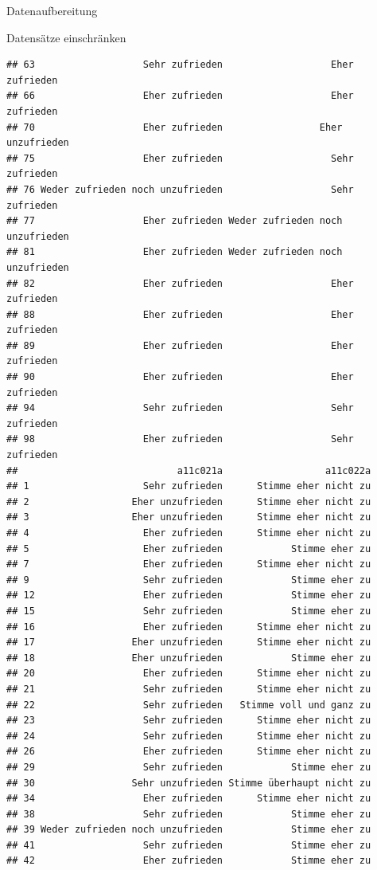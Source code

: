 \documentclass[ignorenonframetext,]{beamer}
\begin{document}
\begin{frame}[fragile]{Datenaufbereitung}
\begin{block}{Datensätze einschränken}
\begin{verbatim}
## 63                   Sehr zufrieden                   Eher zufrieden
## 66                   Eher zufrieden                   Eher zufrieden
## 70                   Eher zufrieden                 Eher unzufrieden
## 75                   Eher zufrieden                   Sehr zufrieden
## 76 Weder zufrieden noch unzufrieden                   Sehr zufrieden
## 77                   Eher zufrieden Weder zufrieden noch unzufrieden
## 81                   Eher zufrieden Weder zufrieden noch unzufrieden
## 82                   Eher zufrieden                   Eher zufrieden
## 88                   Eher zufrieden                   Eher zufrieden
## 89                   Eher zufrieden                   Eher zufrieden
## 90                   Eher zufrieden                   Eher zufrieden
## 94                   Sehr zufrieden                   Sehr zufrieden
## 98                   Eher zufrieden                   Sehr zufrieden
##                            a11c021a                  a11c022a
## 1                    Sehr zufrieden      Stimme eher nicht zu
## 2                  Eher unzufrieden      Stimme eher nicht zu
## 3                  Eher unzufrieden      Stimme eher nicht zu
## 4                    Eher zufrieden      Stimme eher nicht zu
## 5                    Eher zufrieden            Stimme eher zu
## 7                    Eher zufrieden      Stimme eher nicht zu
## 9                    Sehr zufrieden            Stimme eher zu
## 12                   Eher zufrieden            Stimme eher zu
## 15                   Sehr zufrieden            Stimme eher zu
## 16                   Eher zufrieden      Stimme eher nicht zu
## 17                 Eher unzufrieden      Stimme eher nicht zu
## 18                 Eher unzufrieden            Stimme eher zu
## 20                   Eher zufrieden      Stimme eher nicht zu
## 21                   Sehr zufrieden      Stimme eher nicht zu
## 22                   Sehr zufrieden   Stimme voll und ganz zu
## 23                   Sehr zufrieden      Stimme eher nicht zu
## 24                   Sehr zufrieden      Stimme eher nicht zu
## 26                   Eher zufrieden      Stimme eher nicht zu
## 29                   Sehr zufrieden            Stimme eher zu
## 30                 Sehr unzufrieden Stimme überhaupt nicht zu
## 34                   Eher zufrieden      Stimme eher nicht zu
## 38                   Sehr zufrieden            Stimme eher zu
## 39 Weder zufrieden noch unzufrieden            Stimme eher zu
## 41                   Sehr zufrieden            Stimme eher zu
## 42                   Eher zufrieden            Stimme eher zu

\end{verbatim}
\end{block}
\end{frame}
\end{document}
